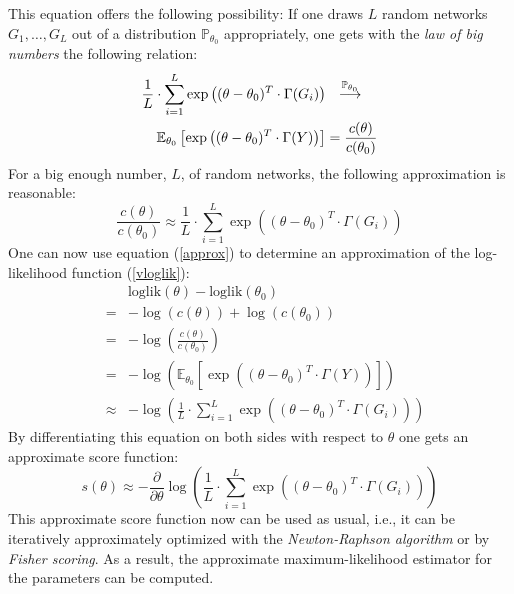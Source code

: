 \documentclass[10pt, conference, compsocconf]{IEEEtran}
\begin{document}
%
This equation offers the following possibility: If one draws $L$ random networks $G_1, \dots ,G_L$ out of a distribution $\mathbb{P}_{\theta_0}$ appropriately, one gets with the \textit{law of big numbers} the following relation:
%
\begin{equation}\label{konver}
\begin{split}
\frac{1}{L}\cdot \sum_{i=1}^{L}  \exp\left((\theta - \theta_0)^T \cdot \Gamma(G_i)\right) &
~~\stackrel {{\tiny\mathbb{P}_{\theta_0}}}{\longrightarrow}~~\\ \mathbb{E}_{\theta_0}\left[ \exp\left((\theta - \theta_0)^T \cdot \Gamma(Y)\right) \right]& = \frac{c(\theta)}{c(\theta_0)}
\end{split}
\end{equation}
%
For a big enough number, $L$, of random networks, the following approximation is reasonable:
%
\begin{equation}
\frac{c(\theta)}{c(\theta_0)} \approx \frac{1}{L}\cdot \sum_{i=1}^{L}  \exp\left((\theta - \theta_0)^T \cdot \Gamma(G_i)\right)
\label{approx}
\end{equation}
%
One can now use equation (\ref{approx}) to determine an approximation of the log-likelihood function (\ref{vloglik}):
%
\begin{eqnarray*}
&&\text{loglik}(\theta)-\text{loglik}(\theta_0)\\&=&- \log(c(\theta))+\log(c(\theta_0))\\
                                             &=&- \log \left( \frac{c(\theta)}{c(\theta_0)} \right)\\
                                             &=&- \log \left( \mathbb{E}_{\theta_0}\left[ \exp\left((\theta - \theta_0)^T \cdot \Gamma(Y)\right) \right] \right)\\
                                             &\approx &- \log \left( \frac{1}{L} \cdot \sum_{i=1}^{L}  \exp \left((\theta - \theta_0)^T \cdot \Gamma(G_i) \right) \right)
\end{eqnarray*}
%
By differentiating this equation on both sides with respect to $\theta$ one gets an approximate score function:
%
\begin{equation}
s(\theta) \approx -\frac{\partial}{\partial \theta} \log \left( \frac{1}{L} \cdot \sum_{i=1}^{L}  \exp \left((\theta - \theta_0)^T \cdot \Gamma(G_i) \right) \right)
\label{score}
\end{equation}
%
This approximate score function now can be used as usual, i.e., it can be iteratively approximately optimized with the \textit{Newton-Raphson algorithm} or by \textit{Fisher scoring}. As a result, the approximate maximum-likelihood estimator for the parameters can be computed.\\[0.3cm]
\end{document}
